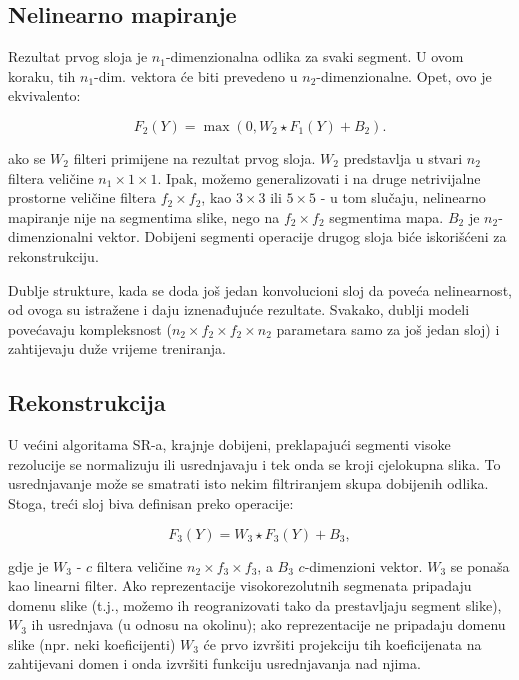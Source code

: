 \documentclass[12pt]{report}
\numberwithin{equation}{section}
\begin{document}
\subsection{Nelinearno mapiranje}

Rezultat prvog sloja je $n_1$-dimenzionalna odlika za svaki segment. U ovom koraku, tih $n_1$-dim. vektora će biti prevedeno u $n_2$-dimenzionalne. Opet, ovo je ekvivalento:

\begin{equation}
  F_2(Y) = \max(0, W_2 \star F_1(Y) + B_2).
\end{equation}

ako se $W_2$ filteri primijene na rezultat prvog sloja. $W_2$ predstavlja u stvari $n_2$ filtera veličine $n_1 \times 1 \times 1$. Ipak, možemo generalizovati i na druge netrivijalne prostorne veličine filtera $f_2 \times f_2$, kao $3 \times 3$  ili $5 \times 5$ - u tom slučaju, nelinearno mapiranje nije na segmentima slike, nego na $f_2 \times f_2$ segmentima mapa. $B_2$ je $n_2$-dimenzionalni vektor. Dobijeni segmenti operacije drugog sloja biće iskorišćeni za rekonstrukciju. 

Dublje strukture, kada se doda još jedan konvolucioni sloj da poveća nelinearnost, od ovoga su istražene i daju iznenađujuće rezultate. Svakako, dublji modeli povećavaju kompleksnost ($n_2 \times f_2 \times f_2 \times n_2$ parametara samo za još jedan sloj) i zahtijevaju duže vrijeme treniranja.  

\subsection{Rekonstrukcija}

U većini algoritama SR-a, krajnje dobijeni, preklapajući segmenti visoke rezolucije se normalizuju ili usrednjavaju  i tek onda se kroji cjelokupna slika. To usrednjavanje može se smatrati isto nekim filtriranjem skupa dobijenih odlika.  Stoga, treći sloj biva definisan preko operacije:

 
\begin{equation}
  F_3(Y) =  W_3 \star F_3(Y) + B_3,
\end{equation}

gdje je $W_3$ - $c$ filtera veličine $n_2 \times f_3 \times f_3$, a $B_3$ $c$-dimenzioni vektor. $W_3$ se ponaša kao linearni filter. Ako reprezentacije visokorezolutnih segmenata pripadaju domenu slike (t.j., možemo ih reogranizovati tako da prestavljaju segment slike), $W_3$ ih usrednjava (u odnosu na okolinu); ako reprezentacije ne pripadaju domenu slike (npr. neki koeficijenti) $W_3$ će prvo izvršiti projekciju tih koeficijenata na zahtijevani domen i onda izvršiti funkciju usrednjavanja nad njima.
\end{document}
